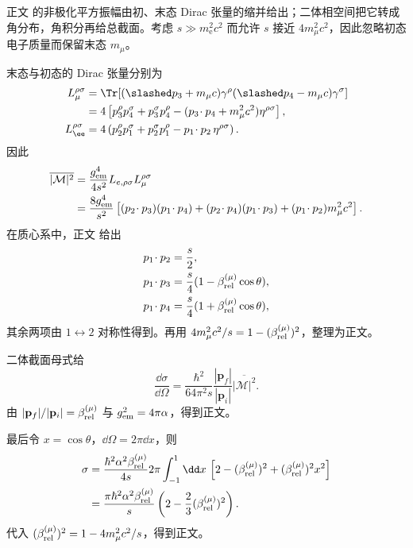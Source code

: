 \begin{derivation}

正文 的非极化平方振幅由初、末态 Dirac 张量的缩并给出；二体相空间把它转成角分布，角积分再给总截面。考虑 $s\gg m_{\mathrm e}^2c^2$ 而允许 $s$ 接近 $4m_\mu^2c^2$，因此忽略初态电子质量而保留末态 $m_\mu$。

末态与初态的 Dirac 张量分别为
\begin{align*}
 L_{\mu}^{\rho\sigma}
 &=\Tr[(\slashed p_3+m_\mu c)\gamma^\rho
 (\slashed p_4-m_\mu c)\gamma^\sigma]\\
 &=4\left[
 p_3^\rho p_4^\sigma+p_3^\sigma p_4^\rho
 -(p_3\!\cdot p_4+m_\mu^2c^2)\eta^{\rho\sigma}
 \right],\\
 L_\ee^{\rho\sigma}
 &=4\left(
 p_2^\rho p_1^\sigma+p_2^\sigma p_1^\rho
 -p_1\!\cdot p_2\,\eta^{\rho\sigma}
 \right).
\end{align*}
因此
\begin{align*}
 \overline{|\mathcal M|^2}
 &=\frac{g_{\rm em}^4}{4s^2}L_{e,\rho\sigma}L_\mu^{\rho\sigma}\\
 &=\frac{8g_{\rm em}^4}{s^2}
 \left[
 (p_2\!\cdot p_3)(p_1\!\cdot p_4)
 +(p_2\!\cdot p_4)(p_1\!\cdot p_3)
 +(p_1\!\cdot p_2)m_\mu^2c^2
 \right].
\end{align*}
在质心系中，正文 给出
\begin{align*}
 p_1\!\cdot p_2&=\frac{s}{2},\\
 p_1\!\cdot p_3&=\frac{s}{4}
 (1-\beta_{\rm rel}^{(\mu)}\cos\theta),\\
 p_1\!\cdot p_4&=\frac{s}{4}
 (1+\beta_{\rm rel}^{(\mu)}\cos\theta),
\end{align*}
其余两项由 $1\leftrightarrow2$ 对称性得到。再用
$4m_\mu^2c^2/s=1-(\beta_{\rm rel}^{(\mu)})^2$，整理为正文。

二体截面母式给
\begin{equation*}
 \frac{\dd\sigma}{\dd\Omega}
 =\frac{\hbar^2}{64\pi^2s}
 \frac{|\mathbf p_f|}{|\mathbf p_i|}
 \overline{|\mathcal M|^2}.
\end{equation*}
由 $|\mathbf p_f|/|\mathbf p_i|=\beta_{\rm rel}^{(\mu)}$ 与
$g_{\rm em}^2=4\pi\alpha$，得到正文。

最后令 $x=\cos\theta$，$\dd\Omega=2\pi\dd x$，则
\begin{align*}
 \sigma
 &=\frac{\hbar^2\alpha^2\beta_{\rm rel}^{(\mu)}}{4s}
 2\pi\int_{-1}^{1}\dd x\,
 \left[2-(\beta_{\rm rel}^{(\mu)})^2
 +(\beta_{\rm rel}^{(\mu)})^2x^2\right]\\
 &=\frac{\pi\hbar^2\alpha^2\beta_{\rm rel}^{(\mu)}}{s}
 \left(2-\frac{2}{3}(\beta_{\rm rel}^{(\mu)})^2\right).
\end{align*}
代入
$(\beta_{\rm rel}^{(\mu)})^2=1-4m_\mu^2c^2/s$，得到正文。
\end{derivation}


